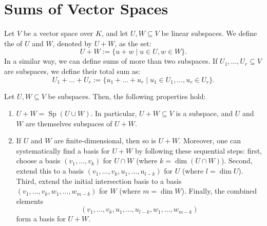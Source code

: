 \renewcommand{\thetheorem}{\thechapter.\arabic{theorem}}
\setcounter{chapter}{13} %
\setcounter{theorem}{0}

\chapter{Sums of Vector Spaces}

\begin{definition}
\label{def:sum_of_subspaces}
Let $V$ be a vector space over $K$, and let $U, W \subseteq V$ be linear subspaces. We define the  of $U$ and $W$, denoted by $U + W$, as the set:
\[
U + W := \{u + w \mid u \in U, w \in W\}.
\]
In a similar way, we can define sums of more than two subspaces. If $U_1, \dots, U_r \subseteq V$ are subspaces, we define their total sum as:
\[
U_1 + \dots + U_r := \{u_1 + \dots + u_r \mid u_1 \in U_1, \dots, u_r \in U_r\}.
\]
\end{definition}

\begin{proposition}
\label{prop:properties_of_sums}
Let $U, W \subseteq V$ be subspaces. Then, the following properties hold:
\begin{enumerate}
    \item $U + W = \operatorname{Sp}(U \cup W)$. In particular, $U + W \subseteq V$ is a subspace, and $U$ and $W$ are themselves subspaces of $U + W$.
    \item If $U$ and $W$ are finite-dimensional, then so is $U + W$. Moreover, one can systematically find a basis for $U + W$ by following these sequential steps: first, choose a basis $(v_1, \dots, v_k)$ for $U \cap W$ (where $k = \dim(U \cap W)$). Second, extend this to a basis $(v_1, \dots, v_k, u_1, \dots, u_{l-k})$ for $U$ (where $l = \dim U$). Third, extend the initial intersection basis to a basis $(v_1, \dots, v_k, w_1, \dots, w_{m-k})$ for $W$ (where $m = \dim W$). Finally, the combined elements 
    \[(v_1, \dots, v_k, u_1, \dots, u_{l-k}, w_1, \dots, w_{m-k})\] 
    form a basis for $U + W$.
\end{enumerate}
\end{proposition}

